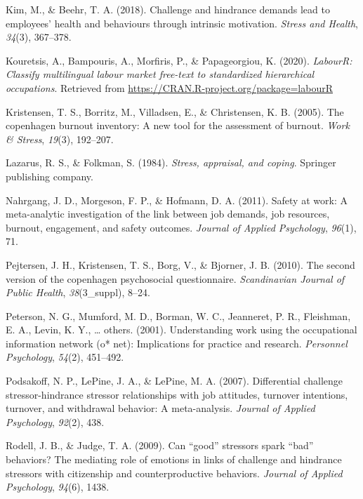 \documentclass[
  english,
  man]{apa6}
\begin{document}
\leavevmode\hypertarget{ref-kim2018challenge}{}%
Kim, M., \& Beehr, T. A. (2018). Challenge and hindrance demands lead to employees' health and behaviours through intrinsic motivation. \emph{Stress and Health}, \emph{34}(3), 367--378.

\leavevmode\hypertarget{ref-R-labourR}{}%
Kouretsis, A., Bampouris, A., Morfiris, P., \& Papageorgiou, K. (2020). \emph{LabourR: Classify multilingual labour market free-text to standardized hierarchical occupations}. Retrieved from \url{https://CRAN.R-project.org/package=labourR}

\leavevmode\hypertarget{ref-kristensen2005copenhagen}{}%
Kristensen, T. S., Borritz, M., Villadsen, E., \& Christensen, K. B. (2005). The copenhagen burnout inventory: A new tool for the assessment of burnout. \emph{Work \& Stress}, \emph{19}(3), 192--207.

\leavevmode\hypertarget{ref-lazarus1984stress}{}%
Lazarus, R. S., \& Folkman, S. (1984). \emph{Stress, appraisal, and coping}. Springer publishing company.

\leavevmode\hypertarget{ref-nahrgang2011safety}{}%
Nahrgang, J. D., Morgeson, F. P., \& Hofmann, D. A. (2011). Safety at work: A meta-analytic investigation of the link between job demands, job resources, burnout, engagement, and safety outcomes. \emph{Journal of Applied Psychology}, \emph{96}(1), 71.

\leavevmode\hypertarget{ref-pejtersen2010second}{}%
Pejtersen, J. H., Kristensen, T. S., Borg, V., \& Bjorner, J. B. (2010). The second version of the copenhagen psychosocial questionnaire. \emph{Scandinavian Journal of Public Health}, \emph{38}(3\_suppl), 8--24.

\leavevmode\hypertarget{ref-peterson2001understanding}{}%
Peterson, N. G., Mumford, M. D., Borman, W. C., Jeanneret, P. R., Fleishman, E. A., Levin, K. Y., \ldots{} others. (2001). Understanding work using the occupational information network (o* net): Implications for practice and research. \emph{Personnel Psychology}, \emph{54}(2), 451--492.

\leavevmode\hypertarget{ref-podsakoff2007differential}{}%
Podsakoff, N. P., LePine, J. A., \& LePine, M. A. (2007). Differential challenge stressor-hindrance stressor relationships with job attitudes, turnover intentions, turnover, and withdrawal behavior: A meta-analysis. \emph{Journal of Applied Psychology}, \emph{92}(2), 438.

\leavevmode\hypertarget{ref-rodell2009can}{}%
Rodell, J. B., \& Judge, T. A. (2009). Can ``good'' stressors spark ``bad'' behaviors? The mediating role of emotions in links of challenge and hindrance stressors with citizenship and counterproductive behaviors. \emph{Journal of Applied Psychology}, \emph{94}(6), 1438.
\end{document}
